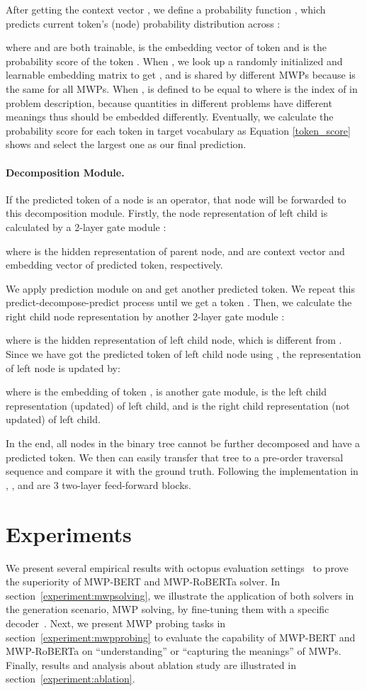 \documentclass[11pt]{article}
\begin{document}
After   getting the context vector , we define a probability   function , which predicts current token's (node) probability distribution across :

where  and  are both trainable,  is the embedding vector of token  and  is the probability score of the token  . When , we look up a randomly initialized and learnable embedding matrix  to get , and  is shared by different MWPs because  is the same for all MWPs. When ,  is defined to be equal to  where  is the index of  in problem description, because quantities in different problems have different meanings thus should be embedded differently. Eventually, we calculate the probability score for each token in target vocabulary as Equation \ref{token_score} shows and select the largest one as our final prediction.

\paragraph{Decomposition Module.}
If the predicted token of a node is an operator, that node will be forwarded to this decomposition module. Firstly, the node representation of left child  is calculated by a 2-layer gate module :

where  is the hidden representation of parent node,  and  are context vector and embedding vector of predicted token, respectively.

We apply prediction module on  and get another predicted token. We repeat this predict-decompose-predict process until we get a token . Then, we calculate the right child node representation by another 2-layer gate module :

where  is the hidden representation of left child node, which is different from . Since we have got the predicted token  of left child node using ,  the representation of left node is updated by:

where  is the embedding of token ,  is another gate module,  is the left child representation (updated) of left child, and  is the right child representation (not updated) of left child.

In the end, all nodes in the binary tree cannot be further decomposed and have a predicted token. We then can easily transfer that tree to a pre-order traversal sequence and compare it with the ground truth. Following the implementation in \cite{xie2019goal}, ,  and  are 3 two-layer feed-forward blocks.
\fi 
\section{Experiments}
We present several empirical results with octopus evaluation settings~\cite{DBLP:conf/acl/BenderK20} to prove the superiority of MWP-BERT {and MWP-RoBERTa} solver. In section~\ref{experiment:mwpsolving}, we illustrate the application of both solvers in the generation scenario, MWP solving, by fine-tuning them with a specific decoder~\cite{xie2019goal}. Next, we present MWP probing tasks in section~\ref{experiment:mwpprobing} to evaluate the capability of MWP-BERT  and MWP-RoBERTa on ``understanding'' or ``capturing the meanings'' of MWPs. Finally, results and analysis about ablation study are illustrated in section~\ref{experiment:ablation}.
\end{document}
